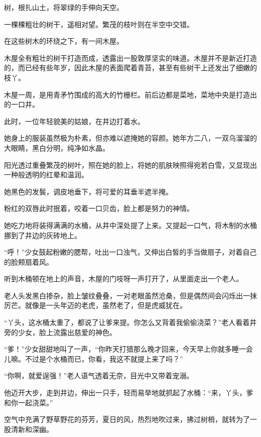 
\begin{this_body}



树，根扎山土，将翠绿的手伸向天空。

一棵棵粗壮的树干，遥相对望。繁茂的枝叶则在半空中交错。

在这些树木的环绕之下，有一间木屋。

木屋全有粗壮的树干打造而成，透露出一股敦厚坚实的味道。木屋并不是新近打造的，而已经有些年岁，因此木屋的表面爬着青苔，甚至有些树干上还发出了细嫩的枝丫。

木屋一周，是用青矛竹围成的高大的竹栅栏。前后边都是菜地，菜地中央是打造出的一口井。

此时，一位年轻貌美的姑娘，在井边打着水。

她身上的服装虽然极为朴素，但亦难以遮掩她的容颜。她年方二八，一双乌溜溜的大眼睛，黑白分明，纯净如水晶。

阳光透过重叠繁茂的树叶，照在她的脸上，将她的肌肤映照得宛若白雪，又显现出一种般透明的红晕和温润。

她黑色的发鬓，调皮地垂下，将可爱的耳垂半遮半掩。

粉红的双唇此时抿着，咬着一口贝齿，脸上都是努力的神情。

她吃力地将装得满满的水桶，从井中深处提了上来。又提起一口气，将木制的水桶挪到了井边的灰砖地上。

“呼！”少女鼓起粉嫩的腮帮，吐出一口浊气，又伸出白皙的手当做扇子，对着自己的脸颊扇着风。

听到木桶顿在地上的声音，木屋的门吱呀一声打开了，从里面走出一个老人。

老人头发黑白掺杂，脸上皱纹叠叠，一对老眼虽然沧桑，但是偶然间会闪烁出一抹厉芒。就像是一头年迈的老虎，虽然老了，但是虎威犹在。

“丫头，这水桶太重了，都说了让爹来提。你怎么又背着我偷偷浇菜？”老人看着井旁的少女，脸上流露出慈爱的神色。

“爹！”少女甜甜地叫了一声，“你昨天打猎那么晚才回来，今天早上你就多睡一会儿嘛。不过是个水桶而已，你看，我这不就提上来了吗？”

“你啊，就爱逞强！”老人语气透着无奈，目光中又带着宠溺。

他迈开大步，走到井边，伸出一只手，轻而易举地就抓起了水桶：“来，丫头，爹和你一起浇菜。”

空气中充满了野草野花的芬芳，夏日的风，热烈地吹过来，拂过树梢，就转为了一股清新和深幽。


\end{this_body}

